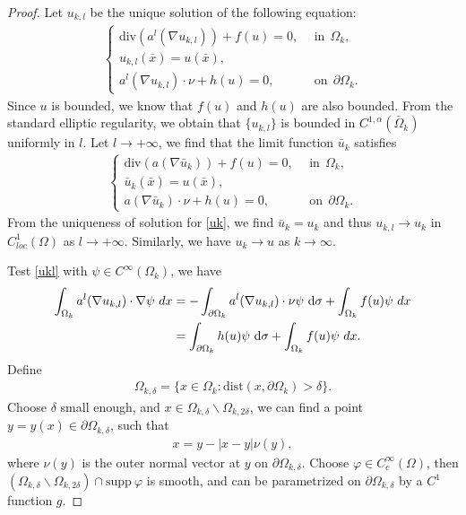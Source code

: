 \documentclass[10pt,a4paper]{amsart}
\numberwithin{equation}{section}
\newcommand{\pa}{\partial}
\newcommand{\dx}{\textup{d}x}
\begin{document}
\begin{proof}
      Let $u_{k,l}$ be the unique solution of the following equation:
    \begin{align}\label{ukl}
        \begin{cases}
            \text{div} (a^l(\nabla u_{k,l})) + f(u) = 0, \ \ & \text{in} \ \ \Omega_k,  \\
            u_{k,l}(\bar{x}) = u(\bar{x}), \\
            a^l(\nabla u_{k,l}) \cdot \nu + h(u) =0, \ \ &\text{on} \ \ \pa \Omega_k.
        \end{cases}
    \end{align}
    Since $u$ is bounded, we know that $f(u)$ and $h(u)$ are also bounded. From the standard elliptic regularity, we obtain that $\{u_{k,l}\}$ is bounded in $C^{1,\alpha}(\bar{\Omega}_k)$ uniformly in $l$. Let $ l \to +\infty$, we find that the limit function $\bar{u}_k$ satisfies
    \begin{align*}
        \begin{cases}
            \text{div} (a(\nabla \bar{u}_k )) + f(u) = 0, \ \ & \text{in} \ \ \Omega_k, \\
            \bar{u}_k(\bar{x}) = u(\bar{x}), \\
            a(\nabla \bar{u}_k) \cdot \nu + h(u) = 0, \ \ & \text{on} \ \ \pa \Omega_k.
        \end{cases}
    \end{align*}
    From the uniqueness of solution for \eqref{uk}, we find $\bar{u}_k = u_k$ and thus $u_{k,l} \to u_k$ in $C_{loc}^{1}(\Omega)$ as $l \to +\infty$. Similarly, we have $u_k \to u$ as $k \to \infty$.

    Test \eqref{ukl} with $ \psi \in C^{\infty}(\Omega_k)$, we have
    \begin{align}\label{psi-test}
        \int_{\Omega_k} a^l(\nabla u_{k,l}) \cdot \nabla \psi \ \dx & = -  \int_{\pa \Omega_k} a^l(\nabla u_{k,l}) \cdot \nu \psi \ \text{d} \sigma + \int_{\Omega_k} f(u) \psi \ \dx \\
         & = \int_{\pa \Omega_k} h(u) \psi \ \text{d} \sigma + \int_{\Omega_k} f(u) \psi \ \dx.  \nonumber
    \end{align}
    Define
    \begin{align*}
        \Omega_{k, \delta} = \{ x \in \Omega_k: \text{dist}(x, \pa \Omega_k) > \delta\}.
    \end{align*}
    Choose $\delta$ small enough, and $x \in \Omega_{k, \delta} \backslash \Omega_{k, 2\delta}$, we can find a point $y = y(x) \in \pa \Omega_{k,\delta}$, such that
    \begin{align*}
        x = y - |x-y| \nu(y),
    \end{align*}
    where $\nu(y)$ is the outer normal vector at $y$ on $\pa \Omega_{k, \delta}$. Choose $ \varphi \in C_c^{\infty}(\Omega)$, then $(\Omega_{k,\delta} \backslash \Omega_{k,2 \delta}) \cap \text{supp} \ \varphi$ is smooth, and can be parametrized on $\pa \Omega_{k, \delta}$ by a $C^1$ function $g$.


\end{proof}
\end{document}
